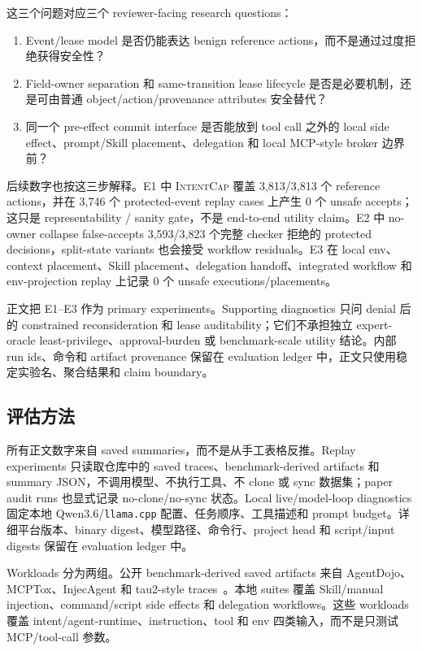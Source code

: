 \documentclass[UTF8,a4paper,11pt]{ctexart}
\newcommand{\sys}{\textsc{IntentCap}\xspace}
\begin{document}
这三个问题对应三个 reviewer-facing research questions：
\begin{enumerate}[leftmargin=*,label=\textbf{RQ\arabic*.}]
  \item Event/lease model 是否仍能表达 benign reference actions，而不是通过过度拒绝获得安全性？
  \item Field-owner separation 和 same-transition lease lifecycle 是否是必要机制，还是可由普通 object/action/provenance attributes 安全替代？
  \item 同一个 pre-effect commit interface 是否能放到 tool call 之外的 local side effect、prompt/Skill placement、delegation 和 local MCP-style broker 边界前？
\end{enumerate}

后续数字也按这三步解释。E1 中 \sys 覆盖 3,813/3,813 个 reference actions，并在 3,746 个 protected-event replay cases 上产生 0 个 unsafe accepts；这只是 representability / sanity gate，不是 end-to-end utility claim。E2 中 no-owner collapse false-accepts 3,593/3,823 个完整 checker 拒绝的 protected decisions，split-state variants 也会接受 workflow residuals。E3 在 local env、context placement、Skill placement、delegation handoff、integrated workflow 和 env-projection replay 上记录 0 个 unsafe executions/placements。

正文把 E1--E3 作为 primary experiments。Supporting diagnostics 只问 denial 后的 constrained reconsideration 和 lease auditability；它们不承担独立 expert-oracle least-privilege、approval-burden 或 benchmark-scale utility 结论。内部 run ids、命令和 artifact provenance 保留在 evaluation ledger 中，正文只使用稳定实验名、聚合结果和 claim boundary。

\subsection{评估方法}

所有正文数字来自 saved summaries，而不是从手工表格反推。Replay experiments 只读取仓库中的 saved traces、benchmark-derived artifacts 和 summary JSON，不调用模型、不执行工具、不 clone 或 sync 数据集；paper audit runs 也显式记录 no-clone/no-sync 状态。Local live/model-loop diagnostics 固定本地 Qwen3.6/\texttt{llama.cpp} 配置、任务顺序、工具描述和 prompt budget。详细平台版本、binary digest、模型路径、命令行、project head 和 script/input digests 保留在 evaluation ledger 中。

Workloads 分为两组。公开 benchmark-derived saved artifacts 来自 AgentDojo、MCPTox、InjecAgent 和 tau2-style traces~\cite{agentdojo,mcptox,injecagent,tau2bench}。本地 suites 覆盖 Skill/manual injection、command/script side effects 和 delegation workflows。这些 workloads 覆盖 intent/agent-runtime、instruction、tool 和 env 四类输入，而不是只测试 MCP/tool-call 参数。
\end{document}
